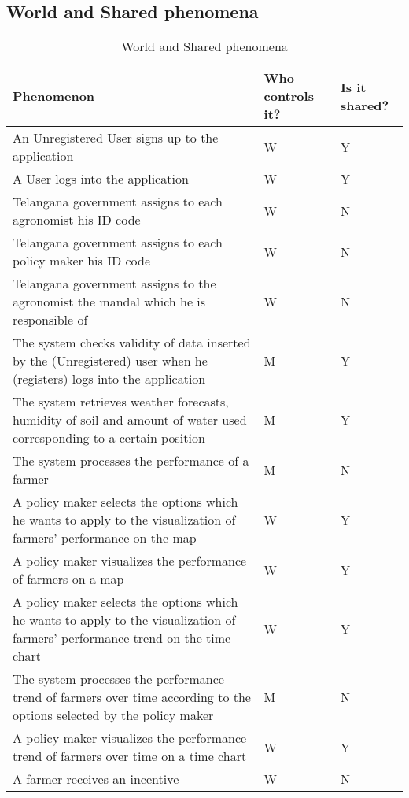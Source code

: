 \subsection{World and Shared phenomena}

\begin{center}
    
\setlength\tabcolsep{7pt}
\renewcommand{\arraystretch}{2}
\begin{longtable}{ |m{7cm}|C{2.3cm}|C{1.6cm}|}
\caption{World and Shared phenomena\label{long}}\\
\hline
\endfirsthead
\endhead
\hline
\endlastfoot
{}
\textbf{Phenomenon} & \textbf{Who controls it?} & \textbf{Is it shared?}\\
\hline

An Unregistered User signs up to the application & W & Y\\
A User logs into the application & W & Y\\
Telangana government assigns to each agronomist his ID code & W & N\\
Telangana government assigns to each policy maker his ID code & W & N\\
Telangana government assigns to the agronomist the mandal which he is responsible of & W & N\\
The system checks validity of data inserted by the (Unregistered) user when he (registers) logs into the application & M & Y\\
The system retrieves weather forecasts, humidity of soil and amount of water used corresponding to a certain position & M & Y\\
The system processes the performance of a farmer & M & N\\
A policy maker selects the options which he wants to apply to the visualization of farmers' performance on the map & W & Y\\
A policy maker visualizes the performance of farmers on a map & W & Y\\
A policy maker selects the options which he wants to apply to the visualization of farmers' performance trend on the time chart & W & Y\\
The system processes the performance trend of farmers over time according to the options selected by the policy maker & M & N\\
A policy maker visualizes the performance trend of farmers over time on a time chart & W & Y\\
A farmer receives an incentive & W & N\\

\end{longtable}
\end{center}
